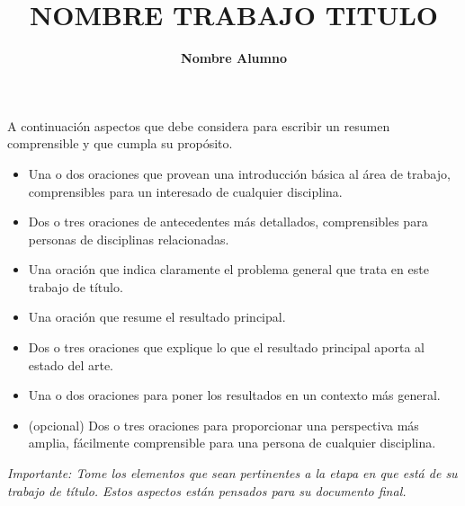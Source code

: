 \documentclass[12pt,letterpaper]{report}
\begin{document}
\title{\textbf{NOMBRE TRABAJO TITULO}}
\author{\textbf{Nombre Alumno}}

\beforepreface
{}
A continuación aspectos que debe considera para escribir un resumen comprensible y que cumpla su propósito. 

\begin{itemize}
    \item Una o dos oraciones que provean una introducción básica al área de trabajo, comprensibles para un interesado de cualquier disciplina.
    \item Dos o tres oraciones de antecedentes más detallados, comprensibles para personas de disciplinas relacionadas.
    \item Una oración que indica claramente el problema general que trata en este trabajo de título.
    \item Una oración que resume el resultado principal.
    \item Dos o tres oraciones que explique lo que el resultado principal aporta al estado del arte.
    \item Una o dos oraciones para poner los resultados en un contexto más general.
    \item (opcional) Dos o tres oraciones para proporcionar una perspectiva más amplia, fácilmente comprensible para una persona de cualquier disciplina.

\end{itemize}

\textit{Importante: Tome los elementos que sean pertinentes a la etapa en que está de su trabajo de título. Estos aspectos están pensados para su documento final. 
}






%


%
%
%



\end{document}
